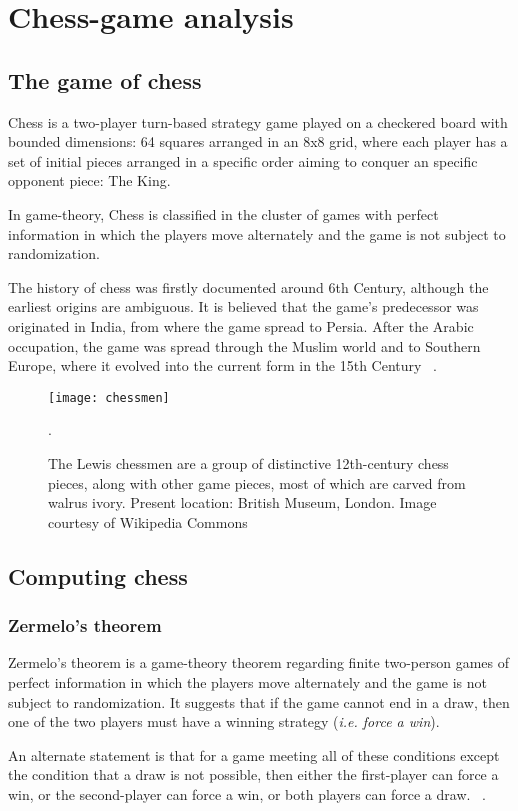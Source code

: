 \chapter{Chess-game analysis}

\section{The game of chess}

Chess is a two-player turn-based strategy game played on a checkered board with bounded dimensions: 64 squares arranged in an 8x8 grid, where each player has a set of initial pieces arranged in a specific order aiming to conquer an specific opponent piece: The King.

In game-theory, Chess is classified in the cluster of games with perfect information in which the players move alternately and the game is not subject to randomization.

The history of chess was firstly documented around 6th Century, although the earliest origins are ambiguous. It is believed that the game's predecessor was originated in India, from where the game spread to Persia. After the Arabic occupation, the game was spread through the Muslim world and to Southern Europe, where it evolved into the current form in the 15th Century ~\cite{murray1913history}.


    \begin{figure}[H]
        \centering
        \texttt{[image: chessmen]}
        \caption{The Lewis chessmen are a group of distinctive 12th-century chess pieces, along with other game pieces, most of which are carved from walrus ivory. Present location: British Museum, London. Image courtesy of Wikipedia Commons}.
    \end{figure}

\section{Computing chess}

\subsection{Zermelo's theorem}

\begin{theorem} 
Zermelo's theorem is a game-theory theorem regarding finite two-person games of perfect information in which the players move alternately and the game is not subject to randomization. It suggests that if the game cannot end in a draw, then one of the two players must have a winning strategy (\textit{i.e. force a win}). 

An alternate statement is that for a game meeting all of these conditions except the condition that a draw is not possible, then either the first-player can force a win, or the second-player can force a win, or both players can force a draw. ~\cite{schwalbe2001zermelo}. 
\end{theorem}

